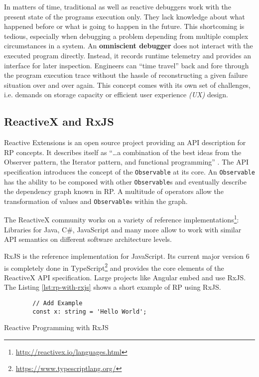 \documentclass[12pt,a4paper]{article}
\begin{document}
In matters of time, traditional as well as reactive debuggers work with the present state of the programs execution only. They lack knowledge about what happened before or what is going to happen in the future. This shortcoming is tedious, especially when debugging a problem depending from multiple complex circumstances in a system. An \textbf{omniscient debugger} \cite{omniscientDebuggerPaper} \cite{mozillaRR} does not interact with the executed program directly. Instead, it records runtime telemetry and provides an interface for later inspection. Engineers can ``time travel'' back and fore through the program execution trace without the hassle of reconstructing a given failure situation over and over again. This concept comes with its own set of challenges, i.e. demands on storage capacity or efficient user experience \emph{(UX)} design. \cite{omniscientDebuggerProblems}

\subsection{ReactiveX and RxJS}

Reactive Extensions is an open source project providing an API description for RP concepts. It describes itself as ``\dots a combination of the best ideas from the Observer pattern, the Iterator pattern, and functional programming'' \cite{reactivex}.  The API specification introduces the concept of the  \texttt{Observable} at its core. An \texttt{Observable} has the ability to be composed with other \texttt{Observable}s and eventually describe the dependency graph known in RP. A multitude of operators allow the transformation of values and \texttt{Observable}s within the graph.

The ReactiveX community works on a variety of reference implementations\footnote{\url{http://reactivex.io/languages.html}}: Libraries for Java, C\#, JavaScript and many more allow to work with similar API semantics on different software architecture levels.

RxJS is the reference implementation for JavaScript. Its current major version 6 is completely done in TypeScript\footnote{\url{https://www.typescriptlang.org/}} and provides the core elements of the ReactiveX API specification. Large projects like Angular embed and use RxJS\cite{angualrrxjs}. The Listing \ref{lst:rp-with-rxjs} shows a short example of RP using RxJS.

\begin{listing}[H]
	\begin{verbatim}
		// Add Example
		const x: string = 'Hello World';
	\end{verbatim}
	\caption{Reactive Programming with RxJS}
	\label{lst:rp-with-rxjs}
\end{listing}
\end{document}

